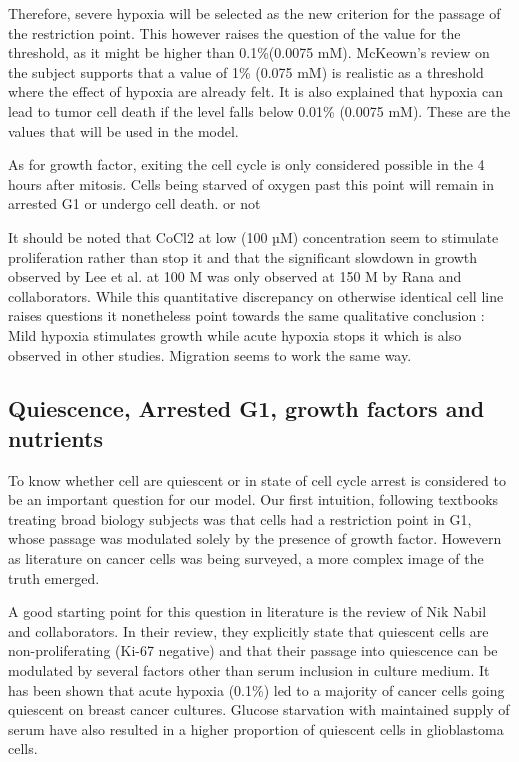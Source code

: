 \documentclass[11pt,a4paper]{article}
\begin{document}
Therefore, severe hypoxia will be selected as the new criterion for the passage of the restriction point. This however raises the question of the value for the threshold, as it might be higher than 0.1\%(0.0075 mM). McKeown's review on the subject supports that a value of 1\% (0.075 mM)  is realistic as a threshold where the effect of hypoxia are already felt. It is also explained that hypoxia can lead to tumor cell death if the level falls below 0.01\% (0.0075 mM).\cite{McKeown2014} These are the values that will be used in the model.

As for growth factor, exiting the cell cycle is only considered possible in the 4 hours  after mitosis. Cells being starved of oxygen past this point will remain in arrested G1 or undergo cell death. or not

It should be noted that CoCl2 at low (100 µM) concentration seem to stimulate proliferation rather than stop it and that the significant slowdown in growth observed by Lee et al. at 100 \textmu M was only observed at 150 \textmu  M by Rana and collaborators.\cite{Lee2018}\cite{Rana2019} While this quantitative discrepancy on otherwise identical cell line raises questions it nonetheless point towards the same qualitative conclusion : Mild hypoxia stimulates growth while acute hypoxia stops it which is also observed in other studies.\cite{Wigerup2016}\cite{Li2009} Migration seems to work the same way.\cite{Bhagat2016}


\subsection{Quiescence, Arrested G1, growth factors and nutrients}
To know whether cell are quiescent or in state of cell cycle arrest is considered to be an important question for our model. Our first intuition, following textbooks treating broad biology subjects was that cells had a restriction point in G1, whose passage was modulated solely by the presence of growth factor.\cite{Cooper2006} Howevern as literature on cancer cells was being surveyed, a more complex image of the truth emerged.

A good starting point for this question in literature is the review of Nik Nabil and collaborators.\cite{Nabil2021} In their review, they explicitly state that quiescent cells are non-proliferating (Ki-67 negative) and that their passage into quiescence can be modulated by several factors other than serum inclusion in culture medium. It has been shown that acute hypoxia (0.1\%) led to a majority of cancer cells going quiescent on breast cancer cultures.\cite{Lee2018} Glucose starvation with maintained supply of serum have also resulted in a higher proportion of quiescent cells in glioblastoma cells.\cite{WangL2018} 
\end{document}
